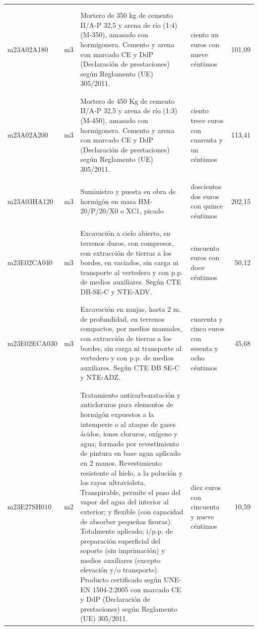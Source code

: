 \documentclass{book}%
\begin{document}
\begin{supertabular}{|l|l|p{5cm}|p{3cm}|r|}
&&&&\\%
&&&&\\%
m23A02A180&m3&Mortero de 350 kg de cemento II/A{-}P 32,5 y arena de río (1:4) (M{-}350), amasado con hormigonera. Cemento y arena con marcado CE y DdP (Declaración de prestaciones) según Reglamento (UE) 305/2011.&ciento un euros con nueve céntimos&101,09\\%
&&&&\\%
&&&&\\%
m23A02A200&m3&Mortero de 450 Kg de cemento II/A{-}P 32,5 y arena de río (1:3) (M{-}450), amasado con hormigonera. Cemento y arena con marcado CE y DdP (Declaración de prestaciones) según Reglamento (UE) 305/2011.&ciento trece euros con cuarenta y un céntimos&113,41\\%
&&&&\\%
&&&&\\%
m23A03HA120&m3&Suministro y puesta en obra de hormigón en masa HM{-}20/P/20/X0 o XC1, picado&doscientos dos euros con quince céntimos&202,15\\%
&&&&\\%
&&&&\\%
m23E02CA040&m3&Excavación a cielo abierto, en terrenos duros, con compresor, con extracción de tierras a los bordes, en vaciados, sin carga ni transporte al vertedero y con p.p. de medios auxiliares. Según CTE DB{-}SE{-}C y NTE{-}ADV.&cincuenta euros con doce céntimos&50,12\\%
&&&&\\%
&&&&\\%
m23E02ECA030&m3&Excavación en zanjas, hasta 2 m. de profundidad, en terrenos compactos, por medios manuales, con extracción de tierras a los bordes, sin carga ni transporte al vertedero y con p.p. de medios auxiliares. Según CTE DB SE{-}C y NTE{-}ADZ.&cuarenta y cinco euros con sesenta y ocho céntimos&45,68\\%
&&&&\\%
&&&&\\%
m23E27SH010&m2&Tratamiento anticarbonatación y anticloruros para elementos de hormigón expuestos a la intemperie o al ataque de gases ácidos, iones cloruros, oxígeno y agua; formado por revestimiento de pintura en base agua aplicado en 2 manos. Revestimiento resistente al hielo, a la polución y los rayos ultravioleta. Transpirable, permite el paso del vapor del agua del interior al exterior; y flexible (con capacidad de absorber pequeñas fisuras). Totalmente aplicado; i/p.p. de preparación superficial del soporte (sin imprimación) y medios auxiliares (excepto elevación y/o transporte). Producto certificado según UNE{-}EN 1504{-}2:2005 con marcado CE y DdP (Declaración de prestaciones) según Reglamento (UE) 305/2011.&diez euros con cincuenta y nueve céntimos&10,59\\%

\end{supertabular}
\end{document}
